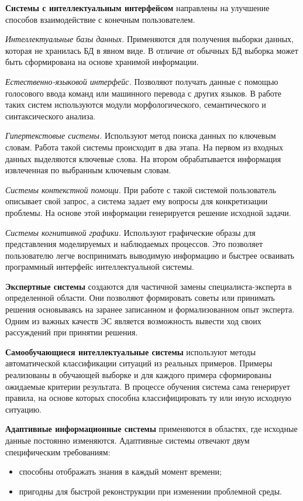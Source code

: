 \textbf{Системы с интеллектуальным интерфейсом} направлены на улучшение способов взаимодействие с конечным пользователем.

\textit{Интеллектуальные базы данных.} Применяются для получения выборки данных, которая не хранилась БД в явном виде. В отличие от обычных БД выборка может быть сформирована на основе хранимой информации.

\textit{Естественно-языковой интерфейс.} Позволяют получать данные с помощью голосового ввода команд или машинного перевода с других языков. В работе таких систем используются модули морфологического, семантического и синтаксического анализа.

\textit{Гипертекстовые системы.} Используют метод поиска данных по ключевым словам. Работа такой системы происходит в два этапа. На первом из входных данных выделяются ключевые слова. На втором  обрабатывается информация извлеченная по выбранным ключевым словам.

\textit{Системы контекстной помощи.} При работе с такой системой пользователь описывает свой запрос, а система задает ему вопросы для конкретизации проблемы. На основе этой информации генерируется решение исходной задачи.

\textit{Системы когнитивной графики.} Используют графические образы для представления моделируемых и наблюдаемых процессов. Это позволяет пользователю легче воспринимать выводимую информацию и быстрее осваивать программный интерфейс интеллектуальной системы.

\textbf{Экспертные системы} создаются для частичной замены специалиста-эксперта в определенной области. Они позволяют формировать советы или принимать решения основываясь на заранее записанном и формализованном опыт эксперта. Одним из важных качеств ЭС является возможность вывести ход своих рассуждений при принятии решения. 

\textbf{Самообучающиеся интеллектуальные системы} используют методы автоматической классификации ситуаций из реальных примеров. Примеры реализованы в обучающей выборке и для каждого примера сформированы ожидаемые критерии результата. В процессе обучения система сама генерирует правила, на основе которых способна классифицировать ту или иную исходную ситуацию. 

\textbf{Адаптивные информационные системы} применяются в областях, где исходные данные постоянно изменяются. Адаптивные системы отвечают двум специфическим требованиям:

\begin{itemize}
\item способны отображать знания в каждый момент времени;
\item пригодны для быстрой реконструкции при изменении проблемной среды.
\end{itemize}

